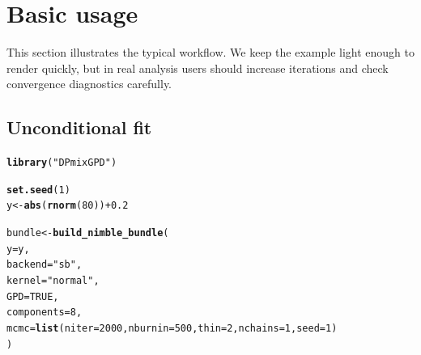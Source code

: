 \documentclass[article]{jss}\usepackage[]{graphicx}\usepackage[]{xcolor}
\makeatletter
\newcommand{\hlnum}[1]{\textcolor[rgb]{0.686,0.059,0.569}{#1}}%
\newcommand{\hlsng}[1]{\textcolor[rgb]{0.192,0.494,0.8}{#1}}%
\newcommand{\hlopt}[1]{\textcolor[rgb]{0,0,0}{#1}}%
\newcommand{\hldef}[1]{\textcolor[rgb]{0.345,0.345,0.345}{#1}}%
\newcommand{\hlkwb}[1]{\textcolor[rgb]{0.69,0.353,0.396}{#1}}%
\newcommand{\hlkwc}[1]{\textcolor[rgb]{0.333,0.667,0.333}{#1}}%
\newcommand{\hlkwd}[1]{\textcolor[rgb]{0.737,0.353,0.396}{\textbf{#1}}}%
\newenvironment{kframe}{%
 \def\at@end@of@kframe{}%
 \ifinner\ifhmode%
  \def\at@end@of@kframe{\end{minipage}}%
  \begin{minipage}{\columnwidth}%
 \fi\fi%
 \def\FrameCommand##1{\hskip\@totalleftmargin \hskip-\fboxsep
 \colorbox{shadecolor}{##1}\hskip-\fboxsep
     \hskip-\linewidth \hskip-\@totalleftmargin \hskip\columnwidth}%
 \MakeFramed {\advance\hsize-\width
   \@totalleftmargin\z@ \linewidth\hsize
   \@setminipage}}%
 {\par\unskip\endMakeFramed%
 \at@end@of@kframe}
\newenvironment{knitrout}{}{} %
\makeatother
\begin{document}
\section{Basic usage}

This section illustrates the typical workflow.
We keep the example light enough to render quickly, but in real analysis users should increase iterations and check convergence diagnostics carefully.

\subsection{Unconditional fit}

\begin{knitrout}
\color{fgcolor}\begin{kframe}
\begin{alltt}
\hlkwd{library}\hldef{(}\hlsng{"DPmixGPD"}\hldef{)}

\hlkwd{set.seed}\hldef{(}\hlnum{1}\hldef{)}
\hldef{y} \hlkwb{<-} \hlkwd{abs}\hldef{(}\hlkwd{rnorm}\hldef{(}\hlnum{80}\hldef{))} \hlopt{+} \hlnum{0.2}

\hldef{bundle} \hlkwb{<-} \hlkwd{build_nimble_bundle}\hldef{(}
  \hlkwc{y} \hldef{= y,}
  \hlkwc{backend} \hldef{=} \hlsng{"sb"}\hldef{,}
  \hlkwc{kernel}  \hldef{=} \hlsng{"normal"}\hldef{,}
  \hlkwc{GPD}     \hldef{=} \hlnum{TRUE}\hldef{,}
  \hlkwc{components} \hldef{=} \hlnum{8}\hldef{,}
  \hlkwc{mcmc} \hldef{=} \hlkwd{list}\hldef{(}\hlkwc{niter} \hldef{=} \hlnum{2000}\hldef{,} \hlkwc{nburnin} \hldef{=} \hlnum{500}\hldef{,} \hlkwc{thin} \hldef{=} \hlnum{2}\hldef{,} \hlkwc{nchains} \hldef{=} \hlnum{1}\hldef{,} \hlkwc{seed} \hldef{=} \hlnum{1}\hldef{)}
\hldef{)}


\end{alltt}
\end{kframe}
\end{knitrout}
\end{document}
